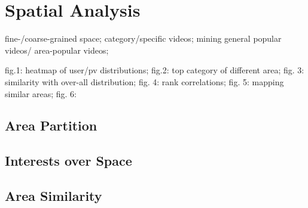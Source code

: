 \section{Spatial Analysis}

fine-/coarse-grained space;
category/specific videos;
mining general popular videos/ area-popular videos;

fig.1: heatmap of user/pv distributions;
fig.2: top category of different area;
fig. 3: similarity with over-all distribution;
fig. 4: rank correlations;
fig. 5: mapping similar areas;
fig. 6: 

\subsection{Area Partition}

\subsection{Interests over Space}

\subsection{Area Similarity}

